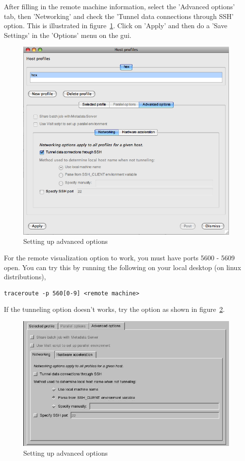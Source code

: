 \documentclass[12pt]{article}
\begin{document}
After filling in the remote machine information, select the 'Advanced options' tab, then 'Networking' and check the 'Tunnel data connections through SSH' option. This is illustrated in figure~\ref{VisItHostProfileAdv}. Click on 'Apply' and then do a 'Save Settings' in the 'Options' menu on the gui.

\begin{figure}
  \center
  \includegraphics[scale=0.5]{VisItHostProfileAdv.png}
  \caption{Setting up advanced options}
  \label{VisItHostProfileAdv}
\end{figure}

For the remote visualization option to work, you must have ports 5600 - 5609 open. You can try this by running the following on your local desktop (on linux distributions),

\begin{Verbatim}[fontsize=\footnotesize]
traceroute -p 560[0-9] <remote machine> 
\end{Verbatim}

If the tunneling option doesn't works, try the option as shown in figure~\ref{VisItHostProfileAdv2}.

\begin{figure}
  \center
  \includegraphics[scale=0.5]{VisItHostProfileAdv2.png}
  \caption{Setting up advanced options}
  \label{VisItHostProfileAdv2}
\end{figure}
\end{document}
